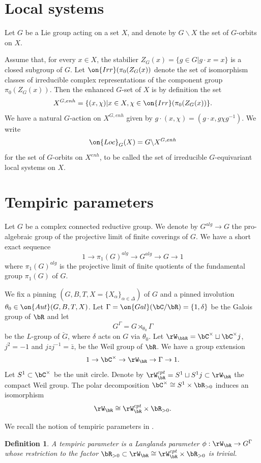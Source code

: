 \documentclass[12pt]{amsart}
\newtheorem{defe}[thm]{Definition}
\theoremstyle{remark}
\begin{document}
\section{Local systems}
Let $G$ be a Lie group acting on a set $X$, and
 denote by $G\backslash X$ the set of $G$-orbits on $X$.

Assume that, for every $x\in X$, the
stabilier $Z_G(x)=\{g\in G|g\cdot x=x\}$ is a closed subgroup of $G$.
Let $\on{Irr}(\pi_0(Z_G(x))$ denote the set of isomorphism classes of irreducible complex representations of the component group $\pi_0(Z_G(x))$.
Then the enhanced $G$-set of $X$
is by definition the set 
\[X^{G,enh}=\{(x,\chi)| x\in X, \chi\in\on{Irr}(\pi_0(Z_G(x))\}.\]
 We have a natural $G$-action on $X^{G,enh}$
 given by $g\cdot(x,\chi)=(g\cdot x,g\chi g^{-1})$.
We write 
\[\on{Loc}_G(X)=G\backslash X^{G,enh}\]
for the set of $G$-orbits on $X^{enh}$, to be called the set  of irreducible $G$-equivariant local systems on $X$.





\section{Tempiric parameters}\label{Tempiric parameters}
Let $G$ be a complex connected reductive group.
We denote by $G^{alg}\to G$ the pro-algebraic group of the projective limit of finite coverings of $G$.
We have a short exact sequence
\[1\to\pi_1(G)^{alg}\to G^{alg}\to G\to 1\]
where $\pi_1(G)^{alg}$ is the projective limit of 
finite quotients of the fundamental group $\pi_1(G)$ of $G$.

We fix a pinning $(G,B,T,X=\{X_\alpha\}_{\alpha\in\Delta})$ of $G$ and 
a pinned involution $\theta_0\in\on{Aut}(G,B,T,X)$.
Let $\Gamma=\on{Gal}(\bC/\bR)=\{1,\delta\}$ be the 
Galois group of $\bR$ and let 
\[G^\Gamma=G\rtimes_{\theta_0}\Gamma\] be the $L$-group of $\check G$, where $\delta$ acts on $G$ via $\theta_0$.
Let $\rW_\bbR=\bC^\times\sqcup\bC^\times j$, $j^2=-1$ and $jzj^{-1}=\bar z$, be the Weil group of $\bR$.
We have a group extension
\[1\to\bC^\times\to\rW_\bR\to\Gamma\to 1.\]
Let $S^1\subset\bC^\times$ be the unit circle.
Denote by $\rW_\bR^{cpt}=S^1\sqcup S^1j\subset\rW_\bR$ the compact Weil group.
The polar decomposition $\bC^\times\cong S^1\times\bR_{>0}$ induces an isomorphism
\[\rW_\bR\cong\rW_\bR^{cpt}\times\bR_{>0}.\]


We recall the notion of tempiric parameters 
in \cite{AA,ABV}.

\begin{defe}
A tempiric parameter is a Langlands parameter
$\phi:\rW_\bR\to G^\Gamma$ 
whose restriction to the factor 
$\bR_{>0}\subset\rW_\bR\cong\rW_\bR^{cpt}\times\bR_{>0}$ is trivial. 

\end{defe}
\end{document}
